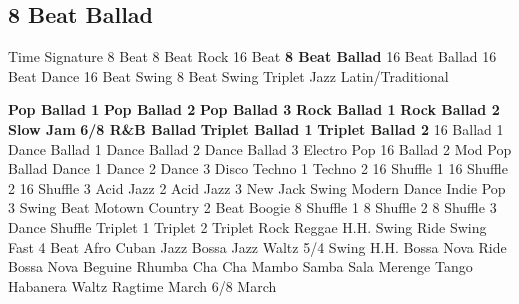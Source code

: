 \subsection{8 Beat Ballad}
Time Signature
8 Beat
8 Beat Rock
16 Beat
\textbf{8 Beat Ballad}
16 Beat Ballad
16 Beat Dance
16 Beat Swing
8 Beat Swing
Triplet
Jazz
Latin/Traditional





























\textbf{Pop Ballad 1}
\textbf{Pop Ballad 2}
\textbf{Pop Ballad 3}
\textbf{Rock Ballad 1}
\textbf{Rock Ballad 2}
\textbf{Slow Jam}
\textbf{6/8 R\&B Ballad}
\textbf{Triplet Ballad 1}
\textbf{Triplet Ballad 2}
16 Ballad 1
Dance Ballad 1
Dance Ballad 2
Dance Ballad 3
Electro Pop
16 Ballad 2
Mod Pop Ballad
Dance 1
Dance 2
Dance 3
Disco
Techno 1
Techno 2
16 Shuffle 1
16 Shuffle 2
16 Shuffle 3
Acid Jazz 2
Acid Jazz 3
New Jack Swing
Modern Dance
Indie Pop 3
Swing Beat
Motown
Country 2 Beat
Boogie
8 Shuffle 1
8 Shuffle 2
8 Shuffle 3
Dance Shuffle
Triplet 1
Triplet 2
Triplet Rock
Reggae
H.H. Swing
Ride Swing
Fast 4 Beat
Afro Cuban
Jazz Bossa
Jazz Waltz
5/4 Swing
H.H. Bossa Nova
Ride Bossa Nova
Beguine
Rhumba
Cha Cha
Mambo
Samba
Sala
Merenge
Tango
Habanera
Waltz
Ragtime
March
6/8 March
